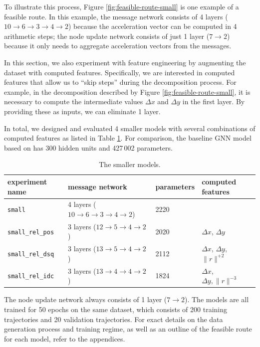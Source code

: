 \documentclass{article}
\begin{document}
To illustrate this process, Figure \ref{fig:feasible-route-small} is one example of a feasible route. In this example, the message network consists of 4 layers ($10 \to 6 \to 3 \to 4 \to 2$) because the acceleration vector can be computed in 4 arithmetic steps; the node update network consists of just 1 layer ($7 \to 2$) because it only needs to aggregate acceleration vectors from the messages.

In this section, we also experiment with feature engineering by augmenting the dataset with computed features. Specifically, we are interested in computed features that allow us to ``skip steps'' during the decomposition process. For example, in the decomposition described by Figure \ref{fig:feasible-route-small}, it is necessary to compute the intermediate values $\Delta x$ and $\Delta y$ in the first layer. By providing these as inputs, we can eliminate 1 layer.

In total, we designed and evaluated 4 smaller models with several combinations of computed features as listed in Table \ref{tab:experiments-small}. For comparison, the baseline GNN model based on \cite{cranmer2020discoveringsymbolicmodelsdeep} has 300 hidden units and 427\,002 parameters.

\begin{table}[h]

\centering
\caption{The smaller models.}
\begin{tabular}{l|l|l|l}
\hline
experiment name & message network & parameters & computed features \\
\hline
\texttt{small} & 4 layers ($10 \to 6 \to 3 \to 4 \to 2$) & 2220 & \\
\texttt{small\_rel\_pos} & 3 layers ($12 \to 5 \to 4 \to 2$) & 2020 & $\Delta x$, $\Delta y$ \\
\texttt{small\_rel\_dsq} & 3 layers ($13 \to 5 \to 4 \to 2$) & 2112 & $\Delta x$, $\Delta y$, $\|r\|^{+2}$\\
\texttt{small\_rel\_idc} & 3 layers ($13 \to 4 \to 4 \to 2$) & 1824 & $\Delta x$, $\Delta y, \|r\|^{-3}$ \\
\hline
\end{tabular}
\label{tab:experiments-small}

\end{table}

The node update network always consists of 1 layer ($7 \to 2$). The models are all trained for 50 epochs on the same dataset, which consists of 200 training trajectories and 20 validation trajectories. For exact details on the data generation process and training regime, as well as an outline of the feasible route for each model, refer to the appendices.
\end{document}
